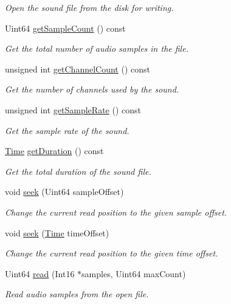 \begin{DoxyCompactItemize}
\begin{DoxyCompactList}\small\item\em Open the sound file from the disk for writing. \end{DoxyCompactList}\item 
Uint64 \hyperlink{classsf_1_1InputSoundFile_a665b7fed6cdca3e0c622909e5a6655e4}{get\+Sample\+Count} () const
\begin{DoxyCompactList}\small\item\em Get the total number of audio samples in the file. \end{DoxyCompactList}\item 
unsigned int \hyperlink{classsf_1_1InputSoundFile_a54307c308ba05dea63aba54a29c804a4}{get\+Channel\+Count} () const
\begin{DoxyCompactList}\small\item\em Get the number of channels used by the sound. \end{DoxyCompactList}\item 
unsigned int \hyperlink{classsf_1_1InputSoundFile_a6b8177e40dd8020752f6d52f96b774c3}{get\+Sample\+Rate} () const
\begin{DoxyCompactList}\small\item\em Get the sample rate of the sound. \end{DoxyCompactList}\item 
\hyperlink{classsf_1_1Time}{Time} \hyperlink{classsf_1_1InputSoundFile_aa081bd4d9732408d10b48227a360778e}{get\+Duration} () const
\begin{DoxyCompactList}\small\item\em Get the total duration of the sound file. \end{DoxyCompactList}\item 
void \hyperlink{classsf_1_1InputSoundFile_aaf97be15020a42e159ff88f76f22af20}{seek} (Uint64 sample\+Offset)
\begin{DoxyCompactList}\small\item\em Change the current read position to the given sample offset. \end{DoxyCompactList}\item 
void \hyperlink{classsf_1_1InputSoundFile_a8eee7af58ad75ddc61f93ad72e2d66c1}{seek} (\hyperlink{classsf_1_1Time}{Time} time\+Offset)
\begin{DoxyCompactList}\small\item\em Change the current read position to the given time offset. \end{DoxyCompactList}\item 
Uint64 \hyperlink{classsf_1_1InputSoundFile_a83d6f64617456601edeb0daf9d14a17f}{read} (Int16 $\ast$samples, Uint64 max\+Count)
\begin{DoxyCompactList}\small\item\em Read audio samples from the open file. \end{DoxyCompactList}\end{DoxyCompactItemize}


